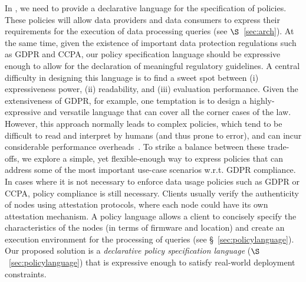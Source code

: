  In \project{}, we need to provide a declarative language for the specification of policies. These policies will allow data providers and data consumers to express their requirements for the execution of data processing queries (see $\S$~\ref{sec:arch}). At the same time, given the existence of important data protection regulations such as GDPR and CCPA, our policy specification language should be expressive enough to allow for the declaration of meaningful regulatory guidelines. A central difficulty in designing this language is to find a sweet spot between (i) expressiveness power, (ii) readability, and (iii) evaluation performance. Given the extensiveness of GDPR, for example, one temptation is to design a highly-expressive and versatile language that can cover all the corner cases of the law. However, this approach normally leads to complex policies, which tend to be difficult to read and interpret by humans (and thus prone to error), and can incur considerable performance overheads~\cite{mehta-security-2017}. To strike a balance between these trade-offs, we explore a simple, yet flexible-enough way to express policies that can address some of the most important use-case scenarios w.r.t. GDPR compliance. In cases where it is not necessary to enforce data usage policies such as GDPR or CCPA, policy compliance is still necessary. Clients usually verify the authenticity of nodes using attestation protocols, where each node could have its own attestation mechanism. A policy language allows a client to concisely specify the characteristics of the nodes (in terms of firmware and location) and create an execution environment for the processing of queries (see \S~\ref{sec:policylanguage}).
 Our proposed solution is a \textit{declarative policy specification language}  ($\S$~\ref{sec:policylanguage}) that is expressive enough to satisfy real-world deployment constraints.



